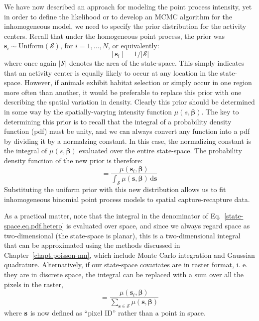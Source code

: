 We have now described an approach for modeling the point process
intensity, yet in order to define the likelihood or to develop an MCMC
algorithm for the inhomogeneous model, we need to specify the prior
distribution for the activity centers. Recall that under the
homogeneous point process, the prior was
$\mathbf{s}_i \sim \text{Uniform}(\mathcal{S})$, for $i=1,\dots,N$, or
equivalently:
\begin{equation}
  \label{state-space.eq.uprior}
  [\mathbf{s}_i] = 1/|\mathcal{S}|
\end{equation}
where once again $|\mathcal{S}|$ denotes the area of the
state-space. This simply indicates that an activity center is equally
likely to occur at any location in the state-space.
However, if animals exhibit habitat selection or simply
occur in one region more often than another, it would be preferable to
replace this prior with one describing the spatial variation in
density. Clearly this prior should be determined in some way by the
spatially-varying intensity function $\mu(s, \bm{\beta})$.
The key to determining this prior is to recall that
the integral of a probability density function (pdf) must be unity,
and we can always convert any function into a pdf by dividing it by a
normalzing constant. In this case, the normalizing constant is the integral
of $\mu(s, \bm{\beta})$ evaluated over the entire state-space.
The probability density function of the new prior is therefore:
\begin{equation}
[\mathbf{s}_i | \bm{\beta}] = \frac{\mu(\mathbf{s}_i, \bm{\beta})}{\int_{\mathcal{S}} \mu(\mathbf{s}, \bm{\beta})\, \mathrm{d}\mathbf{s}}
\label{state-space.eq.pdf.hetero}
\end{equation}
Substituting the uniform prior with this new distribution
allows us to fit inhomogeneous binomial point process
models to spatial capture-recapture data.

As a practical matter, note that the integral in the
denominator of Eq.~\ref{state-space.eq.pdf.hetero} is evaluated over
space, and since we always regard space as two-dimensional (the
state-space is planar), this is a two-dimensional integral that can
be approximated using the methods discussed in
Chapter~\ref{chapt.poisson-mn}, which include
Monte Carlo integration and Gaussian quadrature. Alternatively, if
our state-space covariates are in raster format, i. e. they are
in discrete space, the integral can be replaced with a sum over
all the pixels in the raster,
\begin{equation}
[\mathbf{s}_i | \bm{\beta}] = \frac{\mu(\mathbf{s}_i, \bm{\beta})}{\sum_{\mathbf{s} \in \mathcal{S}} \mu(\mathbf{s}, \bm{\beta})}
\label{state-space.eq.pdf.hetero.d}
\end{equation}
where $\bf s$ is now defined as ``pixel ID'' rather than a point in space.

